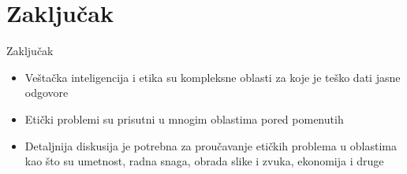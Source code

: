 \documentclass[14pt, aspectratio=169]{beamer}
\begin{document}
\section{Zaključak}

\begin{frame}{Zaključak}
    \begin{itemize}
        \item Veštačka inteligencija i etika su kompleksne oblasti za koje je teško dati jasne odgovore
        \item Etički problemi su prisutni u mnogim oblastima pored pomenutih
        \item Detaljnija diskusija je potrebna za proučavanje etičkih problema u oblastima kao što su umetnost, radna snaga, obrada slike i zvuka, ekonomija i druge
    \end{itemize}
\end{frame}
\end{document}
